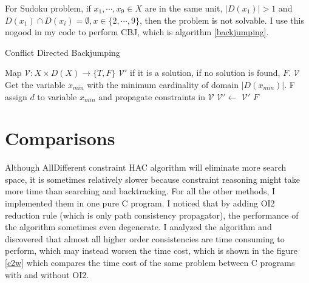 \documentclass[a4paper, 12pt]{report}
\begin{document}
            For Sudoku problem, if $x_1,\cdots, x_9\in X$ are in the same unit, $|D(x_1)|>1$ and $D(x_1)\cap D(x_i)=\emptyset, x\in\{2,\cdots,9\}$, then the problem is not solvable. I use this nogood in my code to perform CBJ, which is algorithm \ref{backjumping}.

             \begin{algorithm}
                \caption{Conflict Directed Backjumping}
                \label{backjumping}
                \begin{algorithmic}[1]
                    \Require Map $\mathcal V:X\times D(X) \to \{T,F\}$
                    \Ensure $\mathcal V'$ if it is a solution, if no solution is found, $F$.
                            \State \Return $\mathcal V$
                        \EndIf
                        \State Get the variable $x_{min}$ with the minimum cardinality of domain $|D(x_{min})|$.
                                    \State \Return F  
                                \EndIf
                            \EndFor
                            \State assign $d$ to variable $x_{min}$ and propagate constraints in $\mathcal V$
                                \State $\mathcal V'\leftarrow$ 
                                    \State \Return $\mathcal V'$
                                \EndIf
                            \EndIf
                        \EndFor
                        \State \Return $F$
                    \EndFunction
                \end{algorithmic}
            \end{algorithm}
    \section {Comparisons}
        Although AllDifferent constraint HAC algorithm will eliminate more search space, it is sometimes relatively slower because constraint reasoning might take more time than searching and backtracking. For all the other methods, I implemented them in one pure C program. I noticed that by adding OI2 reduction rule (which is only path consistency propagator), the performance of the algorithm sometimes even degenerate. I analyzed the algorithm and discovered that almost all higher order consistencies are
        time consuming to perform, which may instead worsen the time cost, which is shown in the figure \ref{c2w} which compares the time cost of the same problem between C programs with and without OI2.
\end{document}
